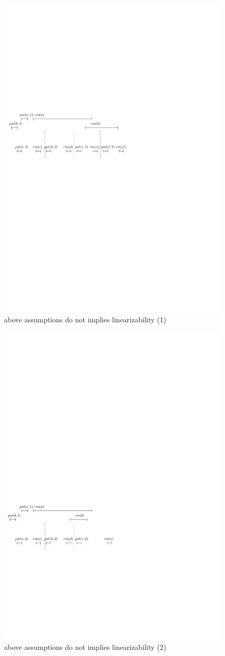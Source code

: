 \begin{figure}[htbp]
  \centering
  \includegraphics[width=0.6 \textwidth]{PIC-HIS-INTRO-OB-ORDER1.pdf}
  \caption{above assumptions do not implies linearizability (1)}
  \label{fig:history introduct ob order1}
\end{figure}




\begin{figure}[htbp]
  \centering
  \includegraphics[width=0.6 \textwidth]{PIC-HIS-INTRO-OB-ORDER2.pdf}
  \caption{above assumptions do not implies linearizability (2)}
  \label{fig:history introduct ob order2}
\end{figure}

